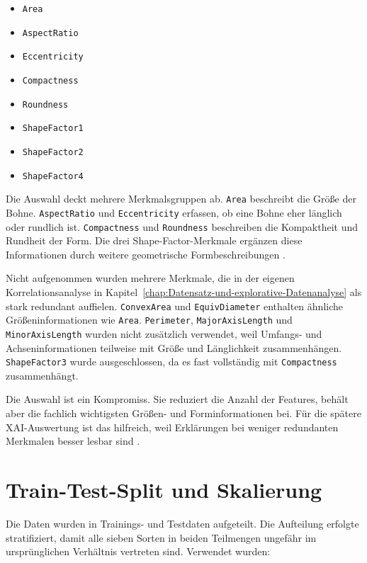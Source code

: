 \begin{itemize}
    \item \texttt{Area}
    \item \texttt{AspectRatio}
    \item \texttt{Eccentricity}
    \item \texttt{Compactness}
    \item \texttt{Roundness}
    \item \texttt{ShapeFactor1}
    \item \texttt{ShapeFactor2}
    \item \texttt{ShapeFactor4}
\end{itemize}

Die Auswahl deckt mehrere Merkmalsgruppen ab. \texttt{Area} beschreibt die Größe der Bohne. \texttt{AspectRatio} und \texttt{Eccentricity} erfassen, ob eine Bohne eher länglich oder rundlich ist. \texttt{Compactness} und \texttt{Roundness} beschreiben die Kompaktheit und Rundheit der Form. Die drei Shape-Factor-Merkmale ergänzen diese Informationen durch weitere geometrische Formbeschreibungen \cite{khan2023comparison}.

Nicht aufgenommen wurden mehrere Merkmale, die in der eigenen Korrelationsanalyse in Kapitel~\ref{chap:Datensatz-und-explorative-Datenanalyse} als stark redundant auffielen. \texttt{ConvexArea} und \texttt{EquivDiameter} enthalten ähnliche Größeninformationen wie \texttt{Area}. \texttt{Perimeter}, \texttt{MajorAxisLength} und \texttt{MinorAxisLength} wurden nicht zusätzlich verwendet, weil Umfangs- und Achseninformationen teilweise mit Größe und Länglichkeit zusammenhängen. \texttt{ShapeFactor3} wurde ausgeschlossen, da es fast vollständig mit \texttt{Compactness} zusammenhängt.

Die Auswahl ist ein Kompromiss. Sie reduziert die Anzahl der Features, behält aber die fachlich wichtigsten Größen- und Forminformationen bei. Für die spätere XAI-Auswertung ist das hilfreich, weil Erklärungen bei weniger redundanten Merkmalen besser lesbar sind \cite[Kap.~18, Kap.~23]{molnar2025interpretable}.

\section{Train-Test-Split und Skalierung}

Die Daten wurden in Trainings- und Testdaten aufgeteilt. Die Aufteilung erfolgte stratifiziert, damit alle sieben Sorten in beiden Teilmengen ungefähr im ursprünglichen Verhältnis vertreten sind. Verwendet wurden:

